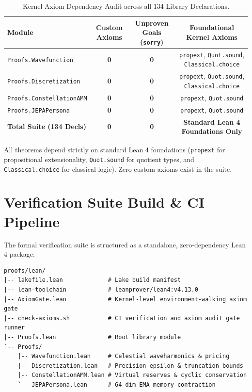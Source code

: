 \documentclass[11pt,a4paper]{article}
\theoremstyle{plain}
\theoremstyle{definition}
\theoremstyle{remark}
\begin{document}
\begin{table}[htbp]
\centering
\small
\begin{tabular}{@{}lccc@{}}
\toprule
\textbf{Module} & \textbf{Custom Axioms} & \textbf{Unproven Goals (\texttt{sorry})} & \textbf{Foundational Kernel Axioms} \\ \midrule
\texttt{Proofs.Wavefunction} & \textbf{0} & \textbf{0} & \texttt{propext}, \texttt{Quot.sound}, \texttt{Classical.choice} \\
\texttt{Proofs.Discretization} & \textbf{0} & \textbf{0} & \texttt{propext}, \texttt{Quot.sound}, \texttt{Classical.choice} \\
\texttt{Proofs.ConstellationAMM} & \textbf{0} & \textbf{0} & \texttt{propext}, \texttt{Quot.sound} \\
\texttt{Proofs.JEPAPersona} & \textbf{0} & \textbf{0} & \texttt{propext}, \texttt{Quot.sound} \\ \midrule
\textbf{Total Suite (134 Decls)} & \textbf{0} & \textbf{0} & \textbf{Standard Lean 4 Foundations Only} \\
\bottomrule
\end{tabular}
\caption{Kernel Axiom Dependency Audit across all 134 Library Declarations.}
\label{tab:axiom_audit}
\end{table}

All theorems depend strictly on standard Lean 4 foundations (\texttt{propext} for propositional extensionality, \texttt{Quot.sound} for quotient types, and \texttt{Classical.choice} for classical logic). Zero custom axioms exist in the suite.

\section{Verification Suite Build \& CI Pipeline}

The formal verification suite is structured as a standalone, zero-dependency Lean 4 package:

\begin{verbatim}
proofs/lean/
|-- lakefile.lean             # Lake build manifest
|-- lean-toolchain            # leanprover/lean4:v4.13.0
|-- AxiomGate.lean            # Kernel-level environment-walking axiom gate
|-- check-axioms.sh           # CI verification and axiom audit gate runner
|-- Proofs.lean               # Root library module
`-- Proofs/
    |-- Wavefunction.lean     # Celestial waveharmonics & pricing
    |-- Discretization.lean   # Precision epsilon & truncation bounds
    |-- ConstellationAMM.lean # Virtual reserves & cyclic conservation
    `-- JEPAPersona.lean      # 64-dim EMA memory contraction
\end{verbatim}
\end{document}
